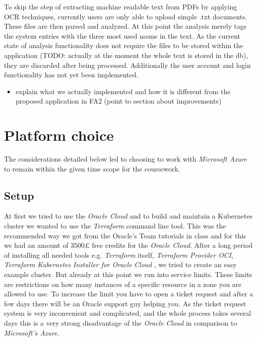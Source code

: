 \documentclass[conference]{IEEEtran}
\begin{document}
To skip the step of extracting machine readable text from PDFs by applying OCR techniques, currently users are only able to upload simple .txt documents. These files are then parsed and analyzed. At this point the analysis merely tags the system entries with the three most used nouns in the text. As the current state of analysis functionality does not require the files to be stored within the application (TODO: actually at the moment the whole text is stored in the db), they are discarded after being processed. Additionally the user account and login functionality has not yet been implemented.

\begin{itemize}
	\item explain what we actually implemented and how it is different from the proposed application in FA2 (point to section about improvements)
\end{itemize}

\section{Platform choice}
\label{sec:platform-choice}
The considerations detailed below led to choosing to work with \textit{Microsoft Azure} to remain within the given time scope for the coursework.

\subsection{Setup}
\label{subsec:setup}
At first we tried to use the \textit{Oracle Cloud} and to build and maintain a Kubernetes cluster we wanted to use the \textit{Terraform} command line tool. This was the recommended way we got from the Oracle's Team tutorials in class and for this we had an amount of $3500\pounds$ free credits for the \textit{Oracle Cloud}.
After a long period of installing all needed tools e.g. \textit{Terraform} itself, \textit{Terraform Provider OCI}\cite{TerraformProviderOCI}, \textit{Terraform Kubernetes Installer for Oracle Cloud} \cite{TerrafromK8sInstaller}, we tried to create an easy example cluster.
But already at this point we run into service limits. These limits are restrictions on how many instances of a specific resource in a zone you are allowed to use. To increase the limit you have to open a ticket request and after a few days there will be an Oracle support guy helping you. As the ticket request system is very inconvenient and complicated, and the whole process takes several days this is a very strong
disadvantage of the \textit{Oracle Cloud} in comparison to \textit{Microsoft's Azure}.
\end{document}
